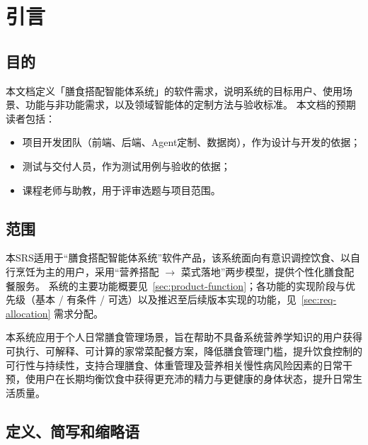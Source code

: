 \documentclass[12pt,a4paper]{ctexart}
\begin{document}
\newpage
\tableofcontents
\newpage


\section{引言}

\subsection{目的}

本文档定义「膳食搭配智能体系统」的软件需求，说明系统的目标用户、使用场景、功能与非功能需求，以及领域智能体的定制方法与验收标准。
本文档的预期读者包括：

\begin{itemize}
\item 项目开发团队（前端、后端、Agent定制、数据岗），作为设计与开发的依据；
\item 测试与交付人员，作为测试用例与验收的依据；
\item 课程老师与助教，用于评审选题与项目范围。
\end{itemize}

\subsection{范围}

本SRS适用于“膳食搭配智能体系统”软件产品，该系统面向有意识调控饮食、以自行烹饪为主的用户，采用“营养搭配 $\rightarrow$ 菜式落地”两步模型，提供个性化膳食配餐服务。
系统的主要功能概要见~\ref{sec:product-function}；各功能的实现阶段与优先级（基本 / 有条件 / 可选）以及推迟至后续版本实现的功能，见~\ref{sec:req-allocation} 需求分配。

本系统应用于个人日常膳食管理场景，旨在帮助不具备系统营养学知识的用户获得可执行、可解释、可计算的家常菜配餐方案，降低膳食管理门槛，提升饮食控制的可行性与持续性，支持合理膳食、体重管理及营养相关慢性病风险因素的日常干预，使用户在长期均衡饮食中获得更充沛的精力与更健康的身体状态，提升日常生活质量。

\subsection{定义、简写和缩略语}
\end{document}
